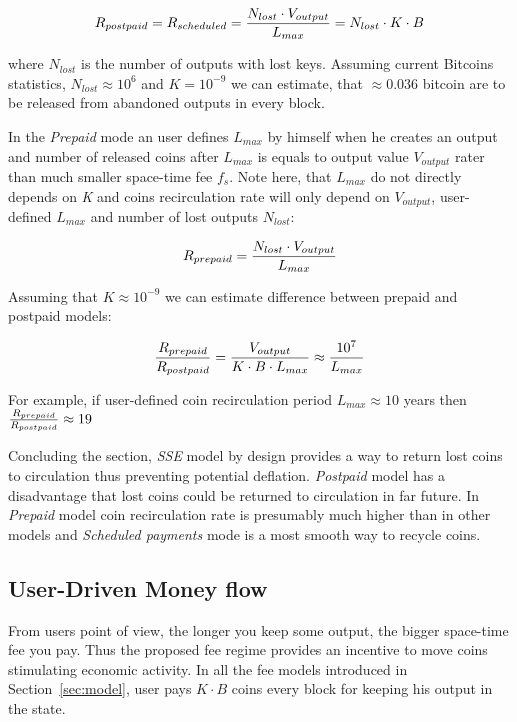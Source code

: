 \documentclass[]{article}   %
\newcommand{\esse}{\textit{SSE}}
\begin{document}
\begin{equation}
R_{postpaid} = R_{scheduled} = {N_{lost} \cdot V_{output} \over L_{max}} = {N_{lost} \cdot K \cdot B}
\end{equation}

where $N_{lost}$ is the number of outputs with lost keys. Assuming current Bitcoins statistics, $N_{lost}\approx10^6$ and $K = 10^{-9}$ we can estimate, that $\approx0.036$ bitcoin are to be released from abandoned outputs in every block.

In the \textit{Prepaid} mode an user defines $L_{max}$ by himself when he creates an output and number of released coins after $L_{max}$ is equals to output value $V_{output}$ rater than much smaller space-time fee $f_s$. Note here, that $L_{max}$ do not directly depends on \textit{K} and coins recirculation rate will only depend on $V_{output}$, user-defined $L_{max}$ and number of lost outputs $N_{lost}$:

\begin{equation}
R_{prepaid} = {N_{lost} \cdot V_{output} \over L_{max}}
\end{equation}

Assuming that $K\approx10^{-9}$ we can estimate difference between prepaid and postpaid models:

\begin{equation}
{R_{prepaid} \over R_{postpaid}} = {V_{output} \over  K \cdot B \cdot L_{max}} \approx {10^7 \over L_{max}}
\end{equation}

For example, if user-defined coin recirculation period $L_{max}\approx10$ years then ${R_{prepaid} \over R_{postpaid}} \approx 19$

Concluding the section, \esse{} model by design provides a way to return lost coins to circulation thus preventing potential deflation. \textit{Postpaid} model has a disadvantage  that lost coins could be returned to circulation in far future. In \textit{Prepaid} model coin recirculation rate is presumably much higher than in other models and \textit{Scheduled payments} mode is a most smooth way to recycle coins.



\subsection{User-Driven Money flow}
\label{sec:flow}

From users point of view, the longer you keep some output, the bigger space-time fee you pay. Thus the proposed fee regime provides an incentive to move coins stimulating economic activity. In all the fee models introduced in Section~\ref{sec:model}, user pays ${K \cdot B}$ coins every block for keeping his output in the state. 
\end{document}
